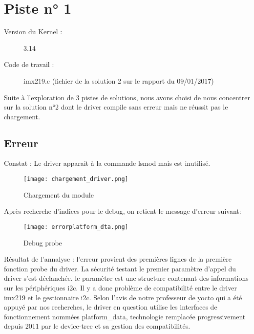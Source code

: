 \chapter{Piste n° 1} %
\label{Chapter2} %

\begin{description}
  \item[Version du Kernel :] 3.14
  \item[Code de travail :] imx219.c (fichier de la solution 2 sur le rapport du
  09/01/2017)
\end{description}

Suite à l'exploration de 3 pistes de solutions, nous avons choisi de nous
concentrer sur la solution n°2 dont le driver compile sans erreur mais ne
réussit pas le chargement.

\section{Erreur}
Constat : Le driver apparait à la commande lsmod mais est inutilisé.

\begin{figure}[th]
   \centering
   \texttt{[image: chargement\_driver.png]}
   \decoRule
   \caption{Chargement du module}  \label{fig:planning}
\end{figure}

Après recherche d'indices pour le debug, on retient le message d'erreur suivant:
\begin{figure}[th]
  \centering
  \texttt{[image: errorplatform\_dta.png]}
  \decoRule
  \caption{Debug probe}  \label{fig:planning}
\end{figure}

Résultat de l'annalyse :
l'erreur provient des premières lignes de la première fonction probe du driver. La
sécurité testant le premier paramètre d'appel du driver s'est déclanchée. le
paramètre est une structure contenant des informations sur les périphériques i2c.
Il y a donc problème de compatibilité entre le driver imx219 et le gestionnaire i2c. Selon
l'avis de notre professeur de yocto qui a été appuyé par nos recherches,
le driver en question utilise les interfaces de fonctionnement nommées
platform\_data, technologie remplacée progressivement depuis 2011 par le
device-tree et sa gestion des compatibilités.

